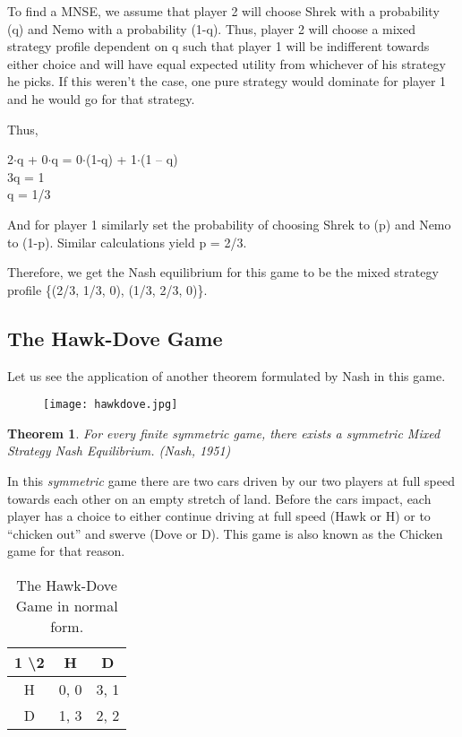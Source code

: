 \documentclass[11pt]{article}
\newtheorem{theorem}{Theorem}
\theoremstyle{definition}
\begin{document}
To find a MNSE, we assume that player 2 will choose Shrek with a probability (q) and Nemo with a probability (1-q). Thus, player 2 will choose a mixed strategy profile dependent on q such that player 1 will be indifferent towards either choice and will have equal expected utility from whichever of his strategy he picks. If this weren't the case, one pure strategy would dominate for player 1 and he would go for that strategy.

Thus,

\begin{center}
2$\cdot$q + 0$\cdot$q = 0$\cdot$(1-q) + 1$\cdot$(1 – q)\\
3q = 1\\
q = 1/3\\
\end{center}


And for player 1 similarly set the probability of choosing Shrek to (p) and Nemo to (1-p). Similar calculations yield p = 2/3.

Therefore, we get the Nash equilibrium for this game to be the mixed strategy profile \{(2/3, 1/3, 0), (1/3, 2/3, 0)\}.

\newpage

\subsection{The Hawk-Dove Game}

Let us see the application of another theorem formulated by Nash in this game.

\begin{figure}[h!]
\centering
\texttt{[image: hawkdove.jpg]}
\label{fig:hd}
\end{figure}
\begin{theorem}
For every finite symmetric game, there exists a symmetric Mixed Strategy Nash Equilibrium. (Nash, 1951)
\end{theorem}

In this \textit{symmetric} game there are two cars driven by our two players at full speed towards each other on an empty stretch of land. Before the cars impact, each player has a choice to either continue driving at full speed (Hawk or H) or to “chicken out” and swerve (Dove or D). This game is also known as the Chicken game for that reason.

\begin{table}[h!]
\centering
\begin{tabular}{|c|c|c|}
\hline
1 \textbackslash 2 & H & D \\
\hline
H & 0, 0 & 3, 1 \\
\hline
D & 1, 3 & 2, 2 \\
\hline
\end{tabular}
\caption{The Hawk-Dove Game in normal form.}
\label{table:hd}
\end{table}
\end{document}
